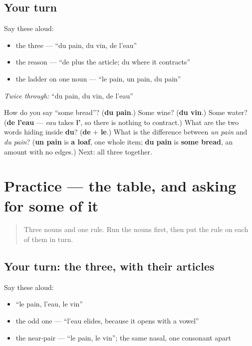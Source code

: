 \subsection*{Your turn}
Say these aloud:

\begin{itemize}
\raggedright
  \item the three — \textquotedblleft{}du pain, du vin, de l'eau\textquotedblright{}
  \item the reason — \textquotedblleft{}de plus the article; du where it contracts\textquotedblright{}
  \item the ladder on one noun — \textquotedblleft{}le pain, un pain, du pain\textquotedblright{}
\end{itemize}

\emph{Twice through:} \textquotedblleft{}du pain, du vin, de l'eau\textquotedblright{}

\begin{tcolorbox}[breakable,colback=teal!4,colframe=teal!35!black,title={Before you move on}]
How do you say \textquotedblleft{}some bread\textquotedblright{}? (\textbf{du pain}.) Some wine? (\textbf{du vin}.) Some water? (\textbf{de l'eau} — \emph{eau} takes \textbf{l'}, so there is nothing to contract.) What are the two words hiding inside \textbf{du}? (\textbf{de} + \textbf{le}.) What is the difference between \emph{un pain} and \emph{du pain}? (\textbf{un pain} is \textbf{a loaf}, one whole item; \textbf{du pain} is \textbf{some bread}, an amount with no edges.) Next: all three together.
\end{tcolorbox}
\section[Practice]{Practice — the table, and asking for some of it}

\label{lesson:FR-C11-practice}



\begin{quote}
Three nouns and one rule. Run the nouns first, then put the rule on each of them in turn.
\end{quote}

\subsection*{Your turn: the three, with their articles}
Say these aloud:

\begin{itemize}
\raggedright
  \item \textquotedblleft{}le pain, l'eau, le vin\textquotedblright{}
  \item the odd one — \textquotedblleft{}l'eau elides, because it opens with a vowel\textquotedblright{}
  \item the near-pair — \textquotedblleft{}le pain, le vin\textquotedblright{}; the same nasal, one consonant apart
\end{itemize}

